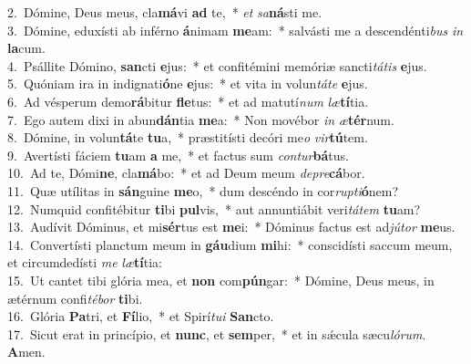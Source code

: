 {2.~}Dómine, Deus meus, cla\textbf{má}vi \textbf{ad} te,~* \textit{et} \textit{sa}\textbf{ná}sti me.\\
{3.~}Dómine, eduxísti ab inférno \textbf{á}nimam \textbf{me}am:~* salvásti me a descendénti\textit{bus} \textit{in} \textbf{la}cum.\\
{4.~}Psállite Dómino, \textbf{san}cti \textbf{e}jus:~* et confitémini memóriæ sancti\textit{tá}\textit{tis} \textbf{e}jus.\\
{5.~}Quóniam ira in indignati\textbf{ó}ne \textbf{e}jus:~* et vita in volun\textit{tá}\textit{te} \textbf{e}jus.\\
{6.~}Ad vésperum demo\textbf{rá}bitur \textbf{fle}tus:~* et ad matutí\textit{num} \textit{læ}\textbf{tí}tia.\\
{7.~}Ego autem dixi in abun\textbf{dán}tia \textbf{me}a:~* Non movébor \textit{in} \textit{æ}\textbf{tér}num.\\
{8.~}Dómine, in volun\textbf{tá}te \textbf{tu}a,~* præstitísti decóri me\textit{o} \textit{vir}\textbf{tú}tem.\\
{9.~}Avertísti fáciem \textbf{tu}am \textbf{a} me,~* et factus sum \textit{con}\textit{tur}\textbf{bá}tus.\\
{10.~}Ad te, Dómi\textbf{ne}, cla\textbf{má}bo:~* et ad Deum meum \textit{de}\textit{pre}\textbf{cá}bor.\\
{11.~}Quæ utílitas in \textbf{sán}guine \textbf{me}o,~* dum descéndo in cor\textit{rup}\textit{ti}\textbf{ó}nem?\\
{12.~}Numquid confitébitur \textbf{ti}bi \textbf{pul}vis,~* aut annuntiábit veri\textit{tá}\textit{tem} \textbf{tu}am?\\
{13.~}Audívit Dóminus, et mi\textbf{sér}tus est \textbf{me}i:~* Dóminus factus est ad\textit{jú}\textit{tor} \textbf{me}us.\\
{14.~}Convertísti planctum meum in \textbf{gáu}dium \textbf{mi}hi:~* conscidísti saccum meum, et circumdedísti \textit{me} \textit{læ}\textbf{tí}tia:\\
{15.~}Ut cantet tibi glória mea, et \textbf{non} com\textbf{pún}gar:~* Dómine, Deus meus, in ætérnum confi\textit{té}\textit{bor} \textbf{ti}bi.\\
{16.~}Glória \textbf{Pa}tri, et \textbf{Fí}lio,~* et Spirí\textit{tu}\textit{i} \textbf{San}cto.\\
{17.~}Sicut erat in princípio, et \textbf{nunc}, et \textbf{sem}per,~* et in sǽcula sæcu\textit{ló}\textit{rum}. \textbf{A}men.\\
